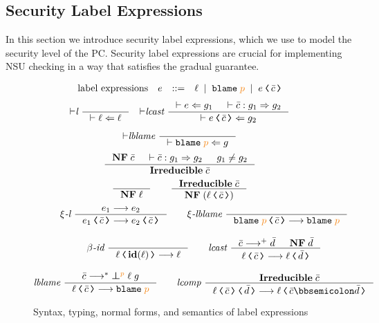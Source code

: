 \subsection{Security Label Expressions}
\label{sec:lexpr}

In this section we introduce security label expressions, which we use
to model the security level of the PC. Security label expressions are
crucial for implementing NSU checking in a way that satisfies the
gradual guarantee.

\begin{figure}[tbp]
\raggedright
  \[
  \begin{array}{rcll}
    \text{label expressions} & e & ::= & \ell \MID \blame{p} \MID \cccast{e}{\bar{c}} \\
  \end{array}
  \]
  {\small
  \begin{gather*}
    {\vdash}\textit{l}~
    \inference{}{\vdash \ell \Leftarrow \ell}
    \quad
    {\vdash}\textit{lcast}~
    \inference{\vdash e \Leftarrow g_1 & \vdash \bar{c} : g_1 \Rightarrow g_2}
    {\vdash \cccast{e}{\bar{c}} \Leftarrow g_2}
    \\[1ex]
    {\vdash}\textit{lblame}~
    \inference{}
    {\vdash \blame{p} \Leftarrow g}
  \end{gather*}}
  {\small
    \begin{gather*}
      \inference{\mathbf{NF} \; \bar{c} & \vdash \bar{c} : g_1 \Rightarrow g_2 & g_1 \neq g_2}
                {\mathbf{Irreducible} \; \bar{c}}
  \end{gather*}}
  {\small
  \begin{gather*}
  \inference{}{\mathbf{NF} \; \ell}
  \qquad
  \inference{\mathbf{Irreducible} \; \bar{c}}{\mathbf{NF} \; (\cccast{\ell}{\bar{c}})}
  \end{gather*}}
  {\small
  \begin{gather*}
  \xi\textit{-l}~
  \inference{e_1 \longrightarrow e_2}
  {\cccast{e_1}{\bar{c}} \longrightarrow \cccast{e_2}{\bar{c}}}
  \qquad
  \xi\textit{-lblame}~
  \inference{}{\cccast{\blame{p}}{\bar{c}} \longrightarrow \blame{p}}
  \\[2ex]
  \beta\textit{-id}~
  \inference{}{\cccast{\ell}{\id{\ell}} \longrightarrow \ell}
  \qquad
  \textit{lcast}~
  \inference{\bar{c} \longrightarrow^{+} \bar{d} & \mathbf{NF} \; \bar{d}}
  {\cccast{\ell}{\bar{c}} \longrightarrow \cccast{\ell}{\bar{d}}}
  \\[2ex]
  \textit{lblame}~
  \inference{\bar{c} \longrightarrow^{*} \err{\ell}{g}{p}}
  {\cccast{\ell}{\bar{c}} \longrightarrow \blame{p}}
  \qquad
  \textit{lcomp}~
  \inference{\mathbf{Irreducible} \; \bar{c}}
  {\cccast{\cccast{\ell}{\bar{c}}}{\bar{d}} \longrightarrow \cccast{\ell}{\bar{c} \mdoubleplus \bar{d}}}
  \end{gather*}}
  \caption{Syntax, typing, normal forms, and semantics of label expressions}
  \label{fig:lexpr}
\end{figure}

